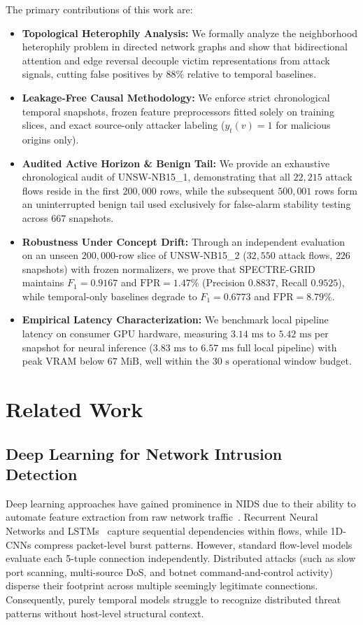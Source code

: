 \documentclass[conference]{IEEEtran}
\begin{document}
The primary contributions of this work are:
\begin{itemize}
    \item \textbf{Topological Heterophily Analysis:} We formally analyze the neighborhood heterophily problem in directed network graphs and show that bidirectional attention and edge reversal decouple victim representations from attack signals, cutting false positives by $88\%$ relative to temporal baselines.
    \item \textbf{Leakage-Free Causal Methodology:} We enforce strict chronological temporal snapshots, frozen feature preprocessors fitted solely on training slices, and exact source-only attacker labeling ($y_t(v) = 1$ for malicious origins only).
    \item \textbf{Audited Active Horizon \& Benign Tail:} We provide an exhaustive chronological audit of UNSW-NB15\_1, demonstrating that all $22{,}215$ attack flows reside in the first $200{,}000$ rows, while the subsequent $500{,}001$ rows form an uninterrupted benign tail used exclusively for false-alarm stability testing across $667$ snapshots.
    \item \textbf{Robustness Under Concept Drift:} Through an independent evaluation on an unseen $200{,}000$-row slice of UNSW-NB15\_2 ($32{,}550$ attack flows, $226$ snapshots) with frozen normalizers, we prove that SPECTRE-GRID maintains $F_1 = 0.9167$ and $\text{FPR} = 1.47\%$ (Precision $0.8837$, Recall $0.9525$), while temporal-only baselines degrade to $F_1 = 0.6773$ and $\text{FPR} = 8.79\%$.
    \item \textbf{Empirical Latency Characterization:} We benchmark local pipeline latency on consumer GPU hardware, measuring $3.14\text{ ms}$ to $5.42\text{ ms}$ per snapshot for neural inference ($3.83\text{ ms}$ to $6.57\text{ ms}$ full local pipeline) with peak VRAM below $67\text{ MiB}$, well within the $30\text{ s}$ operational window budget.
\end{itemize}

\section{Related Work}

\subsection{Deep Learning for Network Intrusion Detection}
Deep learning approaches have gained prominence in NIDS due to their ability to automate feature extraction from raw network traffic~\cite{vinayakumar2019deep,ring2019survey}. Recurrent Neural Networks and LSTMs~\cite{hochreiter1997long} capture sequential dependencies within flows, while 1D-CNNs compress packet-level burst patterns. However, standard flow-level models evaluate each 5-tuple connection independently. Distributed attacks (such as slow port scanning, multi-source DoS, and botnet command-and-control activity) disperse their footprint across multiple seemingly legitimate connections. Consequently, purely temporal models struggle to recognize distributed threat patterns without host-level structural context.
\end{document}
